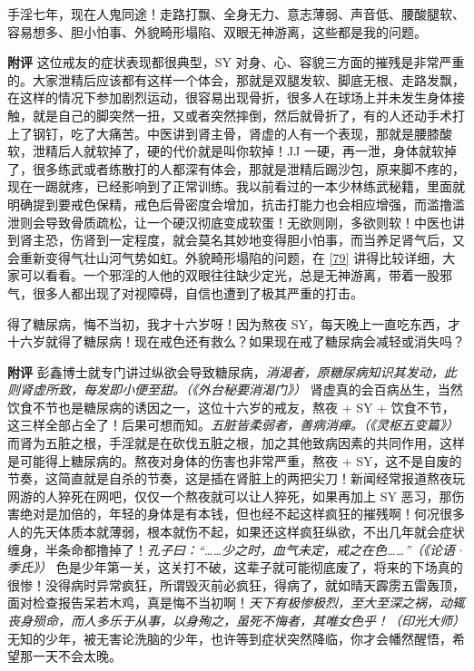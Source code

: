 \begin{case}
    手淫七年，现在人鬼同途！走路打飘、全身无力、意志薄弱、声音低、腰酸腿软、容易想多、胆小怕事、外貌畸形塌陷、双眼无神游离，这些都是我的问题。

    \textbf{附评} 这位戒友的症状表现都很典型，SY 对身、心、容貌三方面的摧残是非常严重的。大家泄精后应该都有这样一个体会，那就是双腿发软、脚底无根、走路发飘，在这样的情况下参加剧烈运动，很容易出现骨折，很多人在球场上并未发生身体接触，就是自己的脚突然一扭，又或者突然摔倒，然后就骨折了，有的人还动手术打上了钢钉，吃了大痛苦。中医讲到肾主骨，肾虚的人有一个表现，那就是腰膝酸软，泄精后人就软掉了，硬的代价就是叫你软掉！JJ 一硬，再一泄，身体就软掉了，很多练武或者练散打的人都深有体会，那就是泄精后踢沙包，原来脚不疼的，现在一踢就疼，已经影响到了正常训练。我以前看过的一本少林练武秘籍，里面就明确提到要戒色保精，戒色后骨密度会增加，抗击打能力也会相应增强，而滥撸滥泄则会导致骨质疏松，让一个硬汉彻底变成软蛋！无欲则刚，多欲则软！中医也讲到肾主恐，伤肾到一定程度，就会莫名其妙地变得胆小怕事，而当养足肾气后，又会重新变得气壮山河气势如虹。外貌畸形塌陷的问题，在 \ref{79} 讲得比较详细，大家可以看看。一个邪淫的人他的双眼往往缺少定光，总是无神游离，带着一股邪气，很多人都出现了对视障碍，自信也遭到了极其严重的打击。
\end{case}

\begin{case}
    得了糖尿病，悔不当初，我才十六岁呀！因为熬夜 SY，每天晚上一直吃东西，才十六岁就得了糖尿病！现在戒色还有救么？如果现在戒了糖尿病会减轻或消失吗？

    \textbf{附评} 彭鑫博士就专门讲过纵欲会导致糖尿病，\textit{消渴者，原糖尿病知识其发动，此则肾虚所致，每发即小便至甜。（《外台秘要消渴门》）} 肾虚真的会百病丛生，当然饮食不节也是糖尿病的诱因之一，这位十六岁的戒友，熬夜 + SY + 饮食不节，这三样全部占全了！后果可想而知。\textit{五脏皆柔弱者，善病消瘅。（《灵枢五变篇》）} 而肾为五脏之根，手淫就是在砍伐五脏之根，加之其他致病因素的共同作用，这样是可能得上糖尿病的。熬夜对身体的伤害也非常严重，熬夜 + SY，这不是自废的节奏，这简直就是自杀的节奏，这是插在肾脏上的两把尖刀！新闻经常报道熬夜玩网游的人猝死在网吧，仅仅一个熬夜就可以让人猝死，如果再加上 SY 恶习，那伤害绝对是加倍的，年轻的身体是有本钱，但也经不起这样疯狂的摧残啊！何况很多人的先天体质本就薄弱，根本就伤不起，如果还这样疯狂纵欲，不出几年就会症状缠身，半条命都撸掉了！\textit{孔子曰：“……少之时，血气未定，戒之在色……”（《论语·季氏》）} 色是少年第一关，这关打不破，这辈子就可能彻底废了，将来的下场真的很惨！没得病时异常疯狂，所谓毁灭前必疯狂，得病了，就如晴天霹雳五雷轰顶，面对检查报告呆若木鸡，真是悔不当初啊！\textit{天下有极惨极烈，至大至深之祸，动辄丧身殒命，而人多乐于从事，以身殉之，虽死不悔者，其唯女色乎！（印光大师）} 无知的少年，被无害论洗脑的少年，也许等到症状突然降临，你才会幡然醒悟，希望那一天不会太晚。
\end{case}

